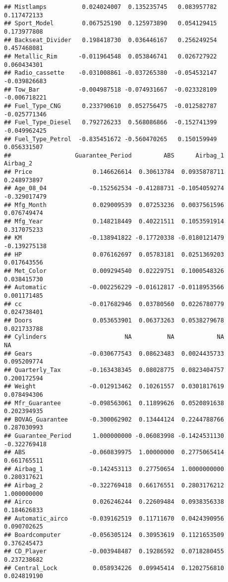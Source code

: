 \documentclass[]{article}
\begin{document}
\begin{verbatim}
## Mistlamps          0.024024007  0.135235745   0.083957782     0.117472133
## Sport_Model        0.067525190  0.125973890   0.054129415     0.173977808
## Backseat_Divider   0.198418730  0.036446167   0.256249254     0.457468081
## Metallic_Rim      -0.011964548  0.053846741   0.026727922     0.060434301
## Radio_cassette    -0.031008861 -0.037265380  -0.054532147    -0.039826683
## Tow_Bar           -0.004987518 -0.074931667  -0.023328109    -0.006718221
## Fuel_Type_CNG      0.233790610  0.052756475  -0.012582787    -0.025771346
## Fuel_Type_Diesel   0.792726233  0.568086866  -0.152741399    -0.049962425
## Fuel_Type_Petrol  -0.835451672 -0.560470265   0.150159949     0.056331507
##                  Guarantee_Period         ABS      Airbag_1     Airbag_2
## Price                 0.146626614  0.30613784  0.0935878711  0.248973897
## Age_08_04            -0.152562534 -0.41288731 -0.1054059274 -0.329017479
## Mfg_Month             0.029009539  0.07253236  0.0037561596  0.076749474
## Mfg_Year              0.148218449  0.40221511  0.1053591914  0.317075233
## KM                   -0.138941822 -0.17720338 -0.0180121479 -0.139275138
## HP                    0.076162697  0.05783181  0.0251369203  0.017643556
## Met_Color             0.009294540  0.02229751  0.1000548326  0.038415730
## Automatic            -0.002256229 -0.01612817 -0.0118953566  0.001171485
## cc                   -0.017682946  0.03780560  0.0226780779  0.024738401
## Doors                 0.053653901  0.06373263  0.0538279678  0.021733788
## Cylinders                      NA          NA            NA           NA
## Gears                -0.030677543  0.08623483  0.0024435733  0.095209774
## Quarterly_Tax        -0.163438345  0.08028775  0.0823404757  0.200172594
## Weight               -0.012913462  0.10261557  0.0301817619  0.078494306
## Mfr_Guarantee        -0.098563061  0.11899626  0.0520891638  0.202394935
## BOVAG_Guarantee      -0.300062902  0.13444124  0.2244788766  0.287030993
## Guarantee_Period      1.000000000 -0.06083998 -0.1424531130 -0.322769418
## ABS                  -0.060839975  1.00000000  0.2775065414  0.661765511
## Airbag_1             -0.142453113  0.27750654  1.0000000000  0.280317621
## Airbag_2             -0.322769418  0.66176551  0.2803176212  1.000000000
## Airco                 0.026246244  0.22609484  0.0938356338  0.184626833
## Automatic_airco      -0.039162519  0.11711670  0.0424390956  0.090702625
## Boardcomputer        -0.056305124  0.30953619  0.1121653509  0.376245473
## CD_Player            -0.003948487  0.19286592  0.0718280455  0.237238682
## Central_Lock          0.058934226  0.09945414  0.1202756810  0.024819190

\end{verbatim}
\end{document}
